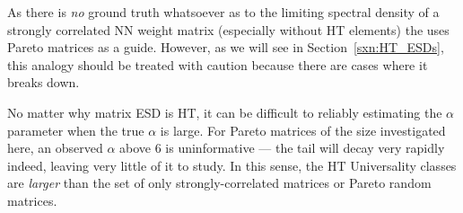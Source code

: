As there is \emph{no} ground truth whatsoever as to the limiting spectral density of a strongly correlated NN weight matrix
(especially without HT elements)
the \HTSR \Phenomenology uses Pareto matrices as  a guide. 
However, as we will see in Section~\ref{sxn:HT_ESDs}, this analogy should be treated with caution because there are 
cases where it breaks down.

No matter why matrix ESD is HT, it can be difficult to reliably estimating the $\alpha$ parameter when
the true $\alpha$ is large. For Pareto matrices of the size investigated here, 
an observed $\alpha$ above $6$ is uninformative --- the tail will decay very rapidly indeed,
leaving very little of it to study.
In this sense, the HT Universality classes are \emph{larger} than the set of only strongly-correlated 
matrices or Pareto random matrices.




